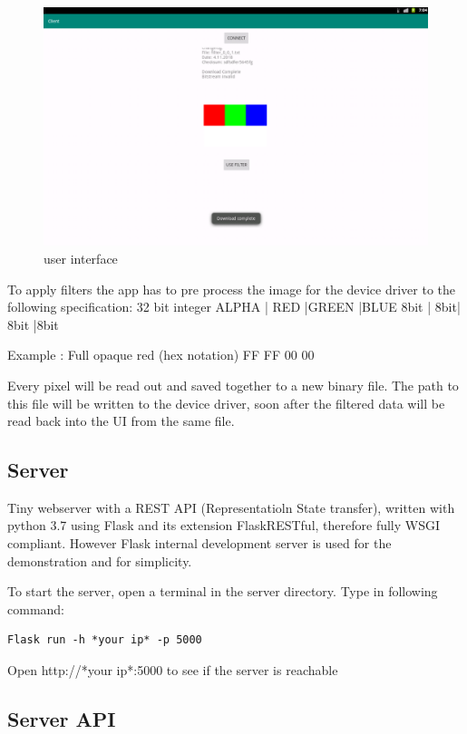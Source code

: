 \begin{figure}[h]
\centering
\includegraphics[width=1\textwidth]{sections/methodology/client_download.png}
\caption{\label{fig:gic} user interface}
\end{figure}



To apply filters the app has to pre process the image for  the device driver to the following specification:
32 bit integer
ALPHA | RED  |GREEN  |BLUE
8bit  |  8bit| 8bit |8bit

Example : Full opaque red (hex notation)
FF FF 00 00

Every pixel will be read out and saved together to a new binary file. 
The path to this file will be written to the device driver, soon after the filtered data will be read back into the UI from the same file.


\subsection{Server}

Tiny webserver with a REST API (Representatioln State transfer), 
written with python 3.7 using Flask and its extension FlaskRESTful, therefore fully WSGI compliant.
However Flask internal development server is used for the demonstration and for simplicity.

To start the server, open a terminal in the server directory. Type in following command:
\begin{verbatim}
Flask run -h *your ip* -p 5000    
\end{verbatim}
Open http://*your ip*:5000 to see if the server is reachable

\subsection{Server API}

